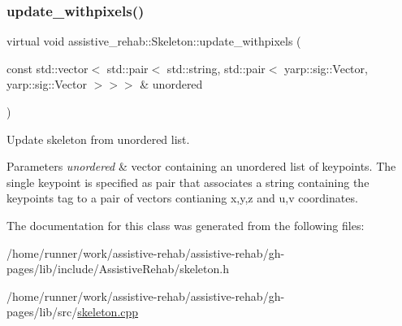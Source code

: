 \subsubsection{\texorpdfstring{update\+\_\+withpixels()}{update\_withpixels()}\hspace{0.1cm}{\footnotesize\ttfamily [2/2]}}
{\footnotesize\ttfamily virtual void assistive\+\_\+rehab\+::\+Skeleton\+::update\+\_\+withpixels (\begin{DoxyParamCaption}\item[{const std\+::vector$<$ std\+::pair$<$ std\+::string, std\+::pair$<$ yarp\+::sig\+::\+Vector, yarp\+::sig\+::\+Vector $>$$>$$>$ \&}]{unordered }\end{DoxyParamCaption})\hspace{0.3cm}{\ttfamily [virtual]}}



Update skeleton from unordered list. 


\begin{DoxyParams}{Parameters}
{\em unordered} & vector containing an unordered list of keypoints. The single keypoint is specified as pair that associates a string containing the keypoint\textquotesingle{}s tag to a pair of vectors contianing x,y,z and u,v coordinates. \\
\hline
\end{DoxyParams}


The documentation for this class was generated from the following files\+:\begin{DoxyCompactItemize}
\item 
/home/runner/work/assistive-\/rehab/assistive-\/rehab/gh-\/pages/lib/include/\+Assistive\+Rehab/skeleton.\+h\item 
/home/runner/work/assistive-\/rehab/assistive-\/rehab/gh-\/pages/lib/src/\hyperlink{skeleton_8cpp}{skeleton.\+cpp}\end{DoxyCompactItemize}
